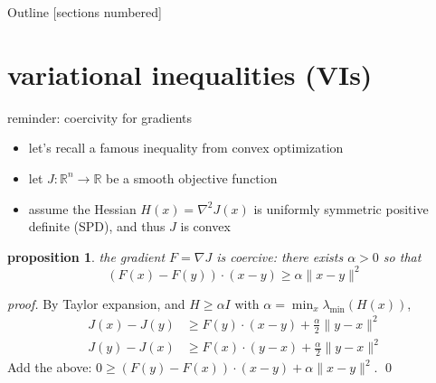 \documentclass[10pt,svgnames]{beamer}
\newtheorem*{proposition}{proposition}
\newcommand{\RR}{\mathbb{R}}
\newcommand{\grad}{\nabla}
\newcommand{\aler}[1]{{\color{FireBrick} #1}}
\begin{document}
\begin{frame}{Outline}
  [sections numbered]
  \tableofcontents[hideallsubsections]
\end{frame}

\AtBeginSection[]
{%
}

\section{variational inequalities (VIs)}

\begin{frame}{reminder: coercivity for gradients}

\begin{itemize}
\item let's recall a famous inequality from convex optimization
\item let $J: \RR^n \to \RR$ be a smooth objective function
\item assume the Hessian $H(x)=\grad^2 J(x)$ is uniformly symmetric positive definite (SPD), and thus $J$ is convex
\end{itemize}

\bigskip
\begin{proposition}
the gradient $F=\nabla J$ is \aler{coercive}: there exists $\alpha > 0$ so that
$$(F(x) - F(y)) \cdot (x - y) \ge \alpha \|x - y\|^2$$
\end{proposition}

\emph{proof.} By Taylor expansion, and $H \ge \alpha I$ with $\alpha=\min_{x} \lambda_{\text{min}}(H(x))$,
\begin{align*}
J(x) - J(y) &\ge F(y) \cdot (x - y) + \frac{\alpha}{2} \|y-x\|^2 \\
J(y) - J(x) &\ge F(x) \cdot (y - x) + \frac{\alpha}{2} \|y-x\|^2
\end{align*}
Add the above: \quad $0 \ge (F(y) - F(x)) \cdot (x-y) +  \alpha \|x - y\|^2$. \qed
\end{frame}
\end{document}
